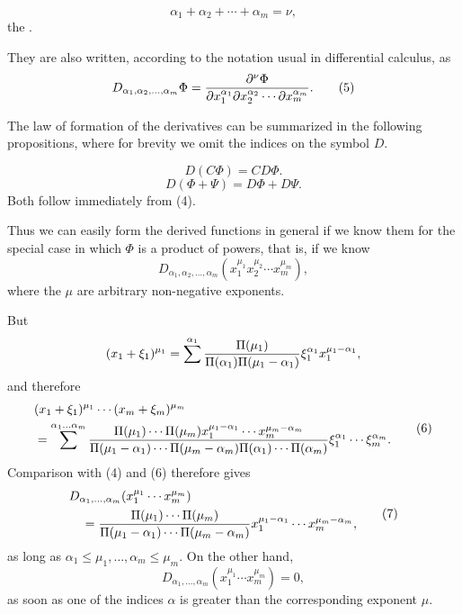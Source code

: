 
\[
 \alpha_1+\alpha_2+\cdots+\alpha_m=\nu,
\]
the .

They are also written, according to the notation usual in differential calculus, as
\begin{equation}
 D_{\alpha_1,\alpha_2,\ldots,\alpha_m}\Phi
 =
 {\partial^\nu\Phi\over
 \partial x_1^{\alpha_1}\partial x_2^{\alpha_2}\cdots\partial x_m^{\alpha_m}}.
\tag{5}
\end{equation}

The law of formation of the derivatives can be summarized in the following propositions, where for brevity we omit the indices on the symbol $D$.

\[
 D(C\Phi)=CD\Phi.
\]
\[
 D(\Phi+\Psi)=D\Phi+D\Psi.
\]
Both follow immediately from (4).

Thus we can easily form the derived functions in general if we know them for the special case in which $\Phi$ is a product of powers, that is, if we know
\[
 D_{\alpha_1,\alpha_2,\ldots,\alpha_m}(x_1^{\mu_1}x_2^{\mu_2}\cdots x_m^{\mu_m}),
\]
where the $\mu$ are arbitrary non-negative exponents.

But
\[
 (x_1+\xi_1)^{\mu_1}
 =\sum^{\alpha_1}{\Pi(\mu_1)\over\Pi(\alpha_1)\Pi(\mu_1-\alpha_1)}
 \xi_1^{\alpha_1}x_1^{\mu_1-\alpha_1},
\]
and therefore
\begin{equation}
\begin{aligned}
&(x_1+\xi_1)^{\mu_1}\cdots(x_m+\xi_m)^{\mu_m}\\
&=\sum^{\alpha_1\ldots\alpha_m}
 {\Pi(\mu_1)\cdots\Pi(\mu_m)x_1^{\mu_1-\alpha_1}\cdots x_m^{\mu_m-\alpha_m}
 \over
 \Pi(\mu_1-\alpha_1)\cdots\Pi(\mu_m-\alpha_m)\Pi(\alpha_1)\cdots\Pi(\alpha_m)}
 \xi_1^{\alpha_1}\cdots\xi_m^{\alpha_m}.
\end{aligned}
\tag{6}
\end{equation}
Comparison with (4) and (6) therefore gives
\begin{equation}
\begin{aligned}
&D_{\alpha_1,\ldots,\alpha_m}(x_1^{\mu_1}\cdots x_m^{\mu_m})\\
&\quad =
{\Pi(\mu_1)\cdots\Pi(\mu_m)\over
 \Pi(\mu_1-\alpha_1)\cdots\Pi(\mu_m-\alpha_m)}
 x_1^{\mu_1-\alpha_1}\cdots x_m^{\mu_m-\alpha_m},
\end{aligned}
\tag{7}
\end{equation}
as long as $\alpha_1\leq\mu_1,\ldots,\alpha_m\leq\mu_m$. On the other hand,
\begin{equation}
 D_{\alpha_1,\ldots,\alpha_m}(x_1^{\mu_1}\cdots x_m^{\mu_m})=0,
\tag{8}
\end{equation}
as soon as one of the indices $\alpha$ is greater than the corresponding exponent $\mu$.
